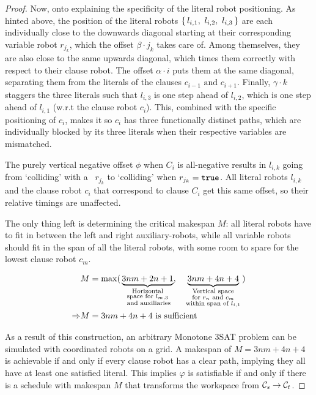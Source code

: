 \begin{proof}
	Now, onto explaining the specificity of the literal robot positioning. 
	As hinted above, the position of the literal robots \(\set{l_{i,1},\ l_{i,2},\ l_{i,3}}\) are each individually close to the downwards diagonal starting at their corresponding variable robot \(r_{j_k}\), which the offset \(\beta \cdot j_k\) takes care of. 
	Among themselves, they are also close to the same upwards diagonal, which times them correctly with respect to their clause robot. 
	The offset \(\alpha \cdot i\) puts them at the same diagonal, separating them from the literals of the clauses \(c_{i-1} \text{ and } c_{i+1}\). 
	Finally, \(\gamma \cdot k\) staggers the three literals such that \(l_{i,3}\) is one step ahead of \(l_{i,2}\), which is one step ahead of \(l_{i,1}\) (w.r.t the clause robot \(c_i\)). 
	This, combined with the specific positioning of \(c_i\), makes it so \(c_i\) has three functionally distinct paths, which are individually blocked by its three literals when their respective variables are mismatched.

	The purely vertical negative offset \(\phi\) when \(C_i\) is all-negative results in \(l_{i,k}\) going from `colliding' with a \false\ \(r_{j_k}\) to `colliding' when \(r_{j_k} = \texttt{true}\). 
	All literal robots \(l_{i,k}\) and the clause robot \(c_i\) that correspond to clause \(C_i\) get this same offset, so their relative timings are unaffected.
	
	The only thing left is determining the critical makespan \(M\): all literal robots have to fit in between the left and right auxiliary-robots, while all variable robots should fit in the span of all the literal robots, with some room to spare for the lowest clause robot \(c_m\).

	\begin{align*}
		& M = \max (\, 
			\underbrace{3nm + 2n + 1}_{
				\substack{
					\text{Horizontal} \\
					\text{space for \(l_{m,3}\)} \\
					\text{ and auxiliaries}
				}
			}, \quad
			\underbrace{3nm + 4n + 4}_{
				\substack{
					\text{Vertical space} \\
					\text{for \(r_n\) and \(c_m\)} \\
					\text{within span of \(l_{i,1}\)}
				}
			}
		 \,) \\
		\Rightarrow & M = 3nm + 4n + 4 \ \text{is sufficient}
	\end{align*}

	As a result of this construction, an arbitrary Monotone 3SAT problem can be simulated with coordinated robots on a grid. 
	A makespan of \(M = 3nm + 4n + 4\) is achievable if and only if every clause robot has a clear path, implying they all have at least one satisfied literal. 
	This implies \(\varphi\) is satisfiable if and only if there is a schedule with makespan \(M\) that transforms the workspace from \(\mathcal{C}_{s} \rightarrow \mathcal{C}_{t}\).
\end{proof}


